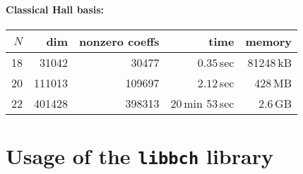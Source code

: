 \documentclass[11pt,a4paper]{article}
\begin{document}
\paragraph{Classical Hall basis:}
\begin{center}
\begin{tabular}{rrrrr}
\hline
$N$ & dim & nonzero coeffs & time  & memory \\
\hline
18 & 31042 & 30477   & $0.35$\,sec & 81248\,kB\\
20 & 111013 & 109697 & $2.12$\,sec & 428\,MB \\
22 & 401428 & 398313 & 20\,min 53\,sec & 2.6\,GB\\
\hline
\end{tabular}
\end{center}

\section{Usage of the {\tt libbch} library}
\end{document}
